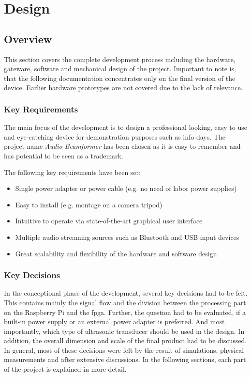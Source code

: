 \chapter{Design}
\section{Overview}
This section covers the complete development process including the hardware, gateware, software and mechanical design of the project. Important to note is, that the following documentation concentrates only on the final version of the device. Earlier hardware prototypes are not covered due to the lack of relevance.

\subsection{Key Requirements}
The main focus of the development is to design a professional looking, easy to use and eye-catching device for demonstration purposes such as info days. The project name \textit{Audio-Beamformer} has been chosen as it is easy to remember and has potential to be seen as a trademark. 

The following key requirements have been set:
\begin{itemize}
    \item Single power adapter or power cable (e.g. no need of labor power supplies) 
    \item Easy to install (e.g. montage on a camera tripod)
    \item Intuitive to operate via state-of-the-art graphical user interface
    \item Multiple audio streaming sources such as Bluetooth and USB input devices
    \item Great scalability and flexibility of the hardware and software design
\end{itemize}

\subsection{Key Decisions}
In the conceptional phase of the development, several key decisions had to be felt. This contains mainly the signal flow and the division between the processing part on the Raspberry Pi and the \acrshort{fpga}. Further, the question had to be evaluated, if a built-in power supply or an external power adapter is preferred. And most importantly, which type of ultrasonic transducer should be used in the design.
In addition, the overall dimension and scale of the final product had to be discussed. 
In general, most of these decisions were felt by the result of simulations, physical measurements and after extensive discussions.
In the following sections, each part of the project is explained in more detail.


